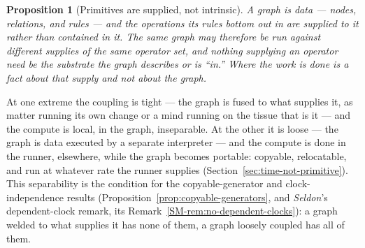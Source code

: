\documentclass[11pt,a4paper]{article}
\newtheorem{proposition}[definition]{Proposition}
\theoremstyle{remark}\newtheorem{remark}[definition]{Remark}
\begin{document}
\begin{proposition}[Primitives are supplied, not intrinsic]\label{prop:rule-runner}
A graph is data --- nodes, relations, and rules --- and the operations its rules bottom out in are supplied to it rather than contained in it. The same graph may therefore be run against different supplies of the same operator set, and nothing supplying an operator need be the substrate the graph describes or is ``in.'' Where the work is done is a fact about that supply and not about the graph.
\end{proposition}
At one extreme the coupling is tight --- the graph is fused to what supplies it, as matter running its own change or a mind running on the tissue that is it --- and the compute is local, in the graph, inseparable. At the other it is loose --- the graph is data executed by a separate interpreter --- and the compute is done in the runner, elsewhere, while the graph becomes portable: copyable, relocatable, and run at whatever rate the runner supplies (Section~\ref{sec:time-not-primitive}). This separability is the condition for the copyable-generator and clock-independence results (Proposition~\ref{prop:copyable-generators}, and \emph{Seldon}'s dependent-clock remark, its Remark~\ref{SM-rem:no-dependent-clocks}): a graph welded to what supplies it has none of them, a graph loosely coupled has all of them.
\end{document}

